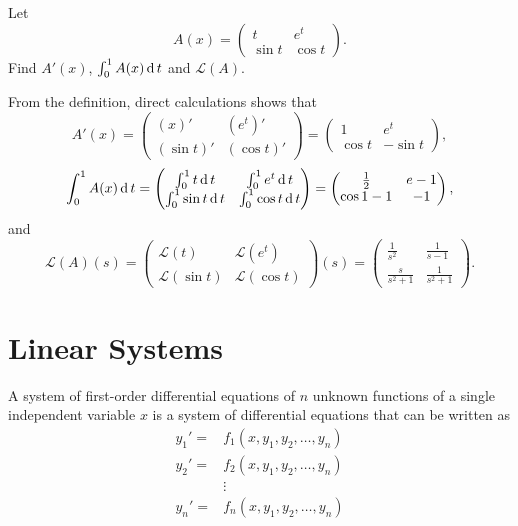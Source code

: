 \begin{example}
  Let 
  \[
  A(x)=\begin{pmatrix}
    t & e^t\\
    \sin t & \cos t
  \end{pmatrix}.  
  \]
  Find $A'(x)$, $\int_0^1 A(x)\operatorname{d} t$ and $\mathcal{L}{(A)}$.
\end{example}
\begin{solution}
  From the definition, direct calculations shows that
  \[
    A'(x) = \begin{pmatrix}
      (x)' & (e^t)'\\
      (\sin t)' & (\cos t)'
    \end{pmatrix} 
    = \begin{pmatrix}
      1 & e^t\\
      \cos t & -\sin t
    \end{pmatrix},
  \]
  \[
    \int_0^1 A(x)\operatorname{d} t = \begin{pmatrix}
      \int_0^1 t \operatorname{d} t & \int_0^1 e^t\operatorname{d} t\\
      \int_0^1\sin t\operatorname{d} t & \int_0^1\cos t\operatorname{d} t
    \end{pmatrix}  
    =\begin{pmatrix}
      \frac12 & e-1\\
      \cos 1 -1 & -1
    \end{pmatrix},
  \]
  and
  \[
    \mathcal{L}(A)(s)= \begin{pmatrix}
      \mathcal{L}{(t)} & \mathcal{L}{(e^t)}\\
      \mathcal{L}{(\sin t)} & \mathcal{L}{(\cos t)}
    \end{pmatrix}(s)  
    =\begin{pmatrix}
      \frac{1}{s^2} & \frac{1}{s-1}\\
      \frac{s}{s^2+1} & \frac{1}{s^2+1}
    \end{pmatrix}.
  \]
\end{solution}


\section{Linear Systems}

A system of first-order differential equations of $n$ unknown functions of a single independent variable $x$ is a system of differential equations that can be written as
\[
  \begin{aligned}
    y_{1}'=&f_{1}\left(x, y_{1}, y_{2}, \ldots, y_{n}\right) \\
    y_{2}'=&f_{2}\left(x, y_{1}, y_{2}, \ldots, y_{n}\right) \\
    & \vdots \\
    y_{n}'=&f_{n}\left(x, y_{1}, y_{2}, \ldots, y_{n}\right)
    \end{aligned}  
\]

